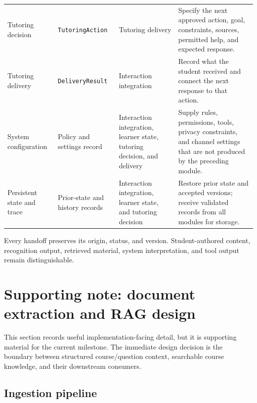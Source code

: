 \documentclass[11pt]{article}
\begin{document}
\begin{tabularx}{\textwidth}{@{}p{}p{}p{}X@{}}
Tutoring decision & \texttt{TutoringAction} & Tutoring delivery & Specify the next approved action, goal, constraints, sources, permitted help, and expected response. \\
Tutoring delivery & \texttt{DeliveryResult} & Interaction integration & Record what the student received and connect the next response to that action. \\
System configuration & Policy and settings record & Interaction integration, learner state, tutoring decision, and delivery & Supply rules, permissions, tools, privacy constraints, and channel settings that are not produced by the preceding module. \\
Persistent state and trace & Prior-state and history records & Interaction integration, learner state, and tutoring decision & Restore prior state and accepted versions; receive validated records from all modules for storage. \\
\bottomrule
\end{tabularx}
\normalsize

Every handoff preserves its origin, status, and version. Student-authored content, recognition output, retrieved material, system interpretation, and tool output remain distinguishable.

\section{Supporting note: document extraction and RAG design}

This section records useful implementation-facing detail, but it is supporting material for the current milestone. The immediate design decision is the boundary between structured course/question context, searchable course knowledge, and their downstream consumers.

\subsection{Ingestion pipeline}
\end{document}
